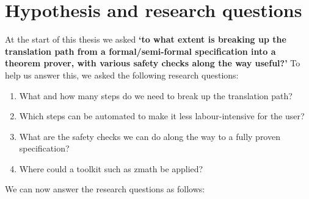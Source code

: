 \section{Hypothesis and research questions}

At the start of this thesis we asked
\textbf{`to what extent is breaking up the translation path from a
formal/semi-formal specification into a theorem prover, with various
safety checks along the way useful?'}
To help us answer this, we asked the following research questions:

\begin{enumerate}
    \item What and how many steps do we need to break up the translation path?
    \item Which steps can be automated to make it less labour-intensive for the user?
    \item What are the safety checks we can do along the way to a fully proven specification?
    \item Where could a toolkit such as \gls{zmath} be applied?
\end{enumerate}

We can now answer the research questions as follows:

